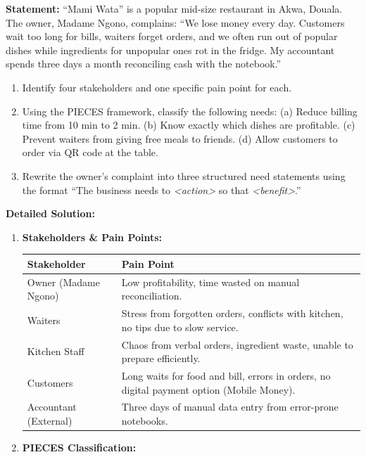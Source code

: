 \documentclass[11pt]{article}
\begin{document}
\begin{exoresolu}
\textbf{Statement:} ``Mami Wata'' is a popular mid-size restaurant in Akwa, Douala. The owner, Madame Ngono, complains: ``We lose money every day. Customers wait too long for bills, waiters forget orders, and we often run out of popular dishes while ingredients for unpopular ones rot in the fridge. My accountant spends three days a month reconciling cash with the notebook.''
\begin{enumerate}
    \item Identify four stakeholders and one specific pain point for each.
    \item Using the PIECES framework, classify the following needs: (a) Reduce billing time from 10 min to 2 min. (b) Know exactly which dishes are profitable. (c) Prevent waiters from giving free meals to friends. (d) Allow customers to order via QR code at the table.
    \item Rewrite the owner's complaint into three structured need statements using the format ``The business needs to \emph{<action>} so that \emph{<benefit>}.''
\end{enumerate}
\tcblower
\textbf{Detailed Solution:}
\begin{enumerate}
    \item \textbf{Stakeholders \& Pain Points:}
    \begin{center}
    \begin{tabularx}{\linewidth}{|l|X|}\hline
    \rowcolor{popblueL} \textbf{Stakeholder} & \textbf{Pain Point} \\ \hline
    Owner (Madame Ngono) & Low profitability, time wasted on manual reconciliation. \\ \hline
    Waiters & Stress from forgotten orders, conflicts with kitchen, no tips due to slow service. \\ \hline
    Kitchen Staff & Chaos from verbal orders, ingredient waste, unable to prepare efficiently. \\ \hline
    Customers & Long waits for food and bill, errors in orders, no digital payment option (Mobile Money). \\ \hline
    Accountant (External) & Three days of manual data entry from error-prone notebooks. \\ \hline
    \end{tabularx}
    \end{center}
    \item \textbf{PIECES Classification:}
    \begin{itemize}

\end{itemize}
\end{enumerate}
\end{exoresolu}
\end{document}
